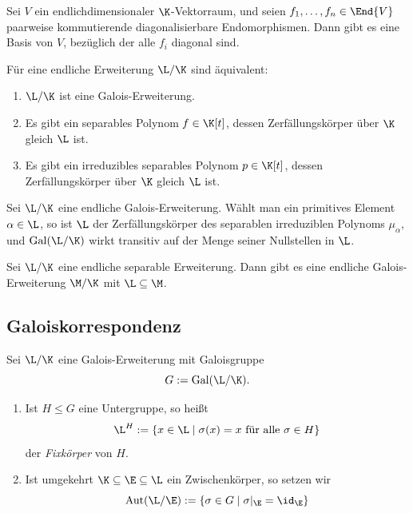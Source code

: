 \documentclass[11pt, a4paper]{article}
\begin{document}
\begin{lemma}
    Sei $V$ ein endlichdimensionaler $\K$-Vektorraum, und seien $f_1,\dots,f_n \in \End{V}$ paarweise kommutierende diagonalisierbare Endomorphismen. Dann gibt es eine Basis von $V$, bezüglich der alle $f_i$ diagonal sind.
\end{lemma}


\begin{theorem} \Theorem
    Für eine endliche Erweiterung $\L/\K$ sind äquivalent:
    \begin{enumerate}[label=(\roman*)]
        \item $\L/\K$ ist eine Galois-Erweiterung.
        \item Es gibt ein separables Polynom $f \in \K[t]$, dessen Zerfällungskörper über $\K$ gleich $\L$ ist.
        \item Es gibt ein irreduzibles separables Polynom $p \in \K[t]$, dessen Zerfällungskörper über $\K$ gleich $\L$ ist.
    \end{enumerate}
\end{theorem}

\begin{corollary}
    Sei $\L/\K$ eine endliche Galois-Erweiterung. Wählt man ein primitives Element $\alpha \in \L$, so ist $\L$ der Zerfällungskörper des separablen irreduziblen Polynoms $\mu_\alpha$, und $\mathrm{Gal}(\L/\K)$ wirkt transitiv auf der Menge seiner Nullstellen in $\L$.
\end{corollary}



\begin{corollary}
    Sei $\L/\K$ eine endliche separable Erweiterung. Dann gibt es eine endliche Galois-Erweiterung $\M/\K$ mit $\L \subseteq \M$.
\end{corollary}

\newpage

\subsection{Galoiskorrespondenz}

\begin{definition}[Fixkörper]
    Sei $\L/\K$ eine Galois-Erweiterung mit Galoisgruppe
    $$G := \mathrm{Gal}(\L/\K).$$
    \begin{enumerate}[label=(\roman*)]
        \item Ist $H \leqslant G$ eine Untergruppe, so heißt
        $$\L^H := \{x \in \L \mid \sigma(x) = x \text{ für alle } \sigma \in H\}$$
        der \emph{Fixkörper} von $H$.
        \item Ist umgekehrt $\K \subseteq \E \subseteq \L$ ein Zwischenkörper, so setzen wir
        $$\mathrm{Aut}(\L/\E) := \{\sigma \in G \mid \sigma|_\E = \id_\E\}$$
    \end{enumerate}
\end{definition}
\end{document}
